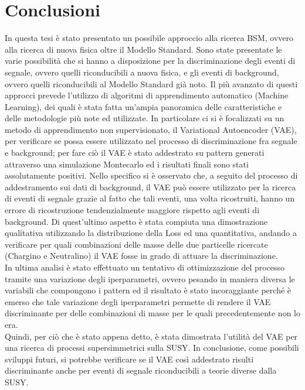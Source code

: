 
\section{Conclusioni}
\label{sec:conclusioni}

In questa tesi è stato presentato un possibile approccio alla ricerca BSM, ovvero alla ricerca di nuova fisica oltre il Modello Standard. Sono state presentate le varie possibilità che si hanno a disposizione per la discriminazione degli eventi di segnale, ovvero quelli riconducibili a nuova fisica, e gli eventi di background, ovvero quelli riconducibili al Modello Standard già noto. Il più avanzato di questi approcci prevede l'utilizzo di algoritmi di apprendimento automatico (Machine Learning), dei quali è stata fatta un'ampia panoramica delle caratteristiche e delle metodologie più note ed utilizzate. In particolare ci si è focalizzati su un metodo di apprendimento non supervisionato, il Variational Autoencoder (VAE), per verificare se possa essere utilizzato nel processo di discriminazione fra segnale e background; per fare ciò il VAE è stato addestrato su pattern generati attraverso una simulazione Montecarlo ed i risultati finali sono stati assolutamente positivi. Nello specifico si è osservato che, a seguito del processo di addestramento sui dati di background, il VAE può essere utilizzato per la ricerca di eventi di segnale grazie al fatto che tali eventi, una volta ricostruiti, hanno un errore di ricostruzione tendenzialmente maggiore rispetto agli eventi di background. Di quest'ultimo aspetto è stata compiuta una dimostrazione qualitativa utilizzando la distribuzione della Loss ed una quantitativa, andando a verificare per quali combinazioni delle masse delle due particelle ricercate (Chargino e Neutralino) il VAE fosse in grado di attuare la discriminazione.\\
In ultima analisi è stato effettuato un tentativo di ottimizzazione del processo tramite una variazione degli iperparametri, ovvero pesando in maniera diversa le variabili che compongono i pattern ed il risultato è stato incoraggiante perché è emerso che tale variazione degli iperparametri permette di rendere il VAE discriminante per delle combinazioni di masse per le quali precedentemente non lo era.\\
Quindi, per ciò che è stato appena detto, è stata dimostrata l'utilità del VAE per una ricerca di processi supersimmetrici sulla SUSY. In conclusione, come possibili sviluppi futuri, si potrebbe verificare se il VAE così addestrato risulti discriminante anche per eventi di segnale riconducibili a teorie diverse dalla SUSY.